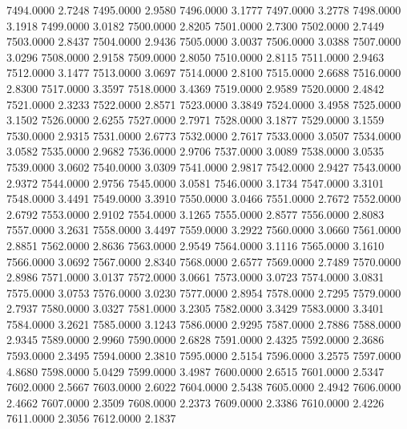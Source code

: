 7494.0000      2.7248
7495.0000      2.9580
7496.0000      3.1777
7497.0000      3.2778
7498.0000      3.1918
7499.0000      3.0182
7500.0000      2.8205
7501.0000      2.7300
7502.0000      2.7449
7503.0000      2.8437
7504.0000      2.9436
7505.0000      3.0037
7506.0000      3.0388
7507.0000      3.0296
7508.0000      2.9158
7509.0000      2.8050
7510.0000      2.8115
7511.0000      2.9463
7512.0000      3.1477
7513.0000      3.0697
7514.0000      2.8100
7515.0000      2.6688
7516.0000      2.8300
7517.0000      3.3597
7518.0000      3.4369
7519.0000      2.9589
7520.0000      2.4842
7521.0000      2.3233
7522.0000      2.8571
7523.0000      3.3849
7524.0000      3.4958
7525.0000      3.1502
7526.0000      2.6255
7527.0000      2.7971
7528.0000      3.1877
7529.0000      3.1559
7530.0000      2.9315
7531.0000      2.6773
7532.0000      2.7617
7533.0000      3.0507
7534.0000      3.0582
7535.0000      2.9682
7536.0000      2.9706
7537.0000      3.0089
7538.0000      3.0535
7539.0000      3.0602
7540.0000      3.0309
7541.0000      2.9817
7542.0000      2.9427
7543.0000      2.9372
7544.0000      2.9756
7545.0000      3.0581
7546.0000      3.1734
7547.0000      3.3101
7548.0000      3.4491
7549.0000      3.3910
7550.0000      3.0466
7551.0000      2.7672
7552.0000      2.6792
7553.0000      2.9102
7554.0000      3.1265
7555.0000      2.8577
7556.0000      2.8083
7557.0000      3.2631
7558.0000      3.4497
7559.0000      3.2922
7560.0000      3.0660
7561.0000      2.8851
7562.0000      2.8636
7563.0000      2.9549
7564.0000      3.1116
7565.0000      3.1610
7566.0000      3.0692
7567.0000      2.8340
7568.0000      2.6577
7569.0000      2.7489
7570.0000      2.8986
7571.0000      3.0137
7572.0000      3.0661
7573.0000      3.0723
7574.0000      3.0831
7575.0000      3.0753
7576.0000      3.0230
7577.0000      2.8954
7578.0000      2.7295
7579.0000      2.7937
7580.0000      3.0327
7581.0000      3.2305
7582.0000      3.3429
7583.0000      3.3401
7584.0000      3.2621
7585.0000      3.1243
7586.0000      2.9295
7587.0000      2.7886
7588.0000      2.9345
7589.0000      2.9960
7590.0000      2.6828
7591.0000      2.4325
7592.0000      2.3686
7593.0000      2.3495
7594.0000      2.3810
7595.0000      2.5154
7596.0000      3.2575
7597.0000      4.8680
7598.0000      5.0429
7599.0000      3.4987
7600.0000      2.6515
7601.0000      2.5347
7602.0000      2.5667
7603.0000      2.6022
7604.0000      2.5438
7605.0000      2.4942
7606.0000      2.4662
7607.0000      2.3509
7608.0000      2.2373
7609.0000      2.3386
7610.0000      2.4226
7611.0000      2.3056
7612.0000      2.1837
